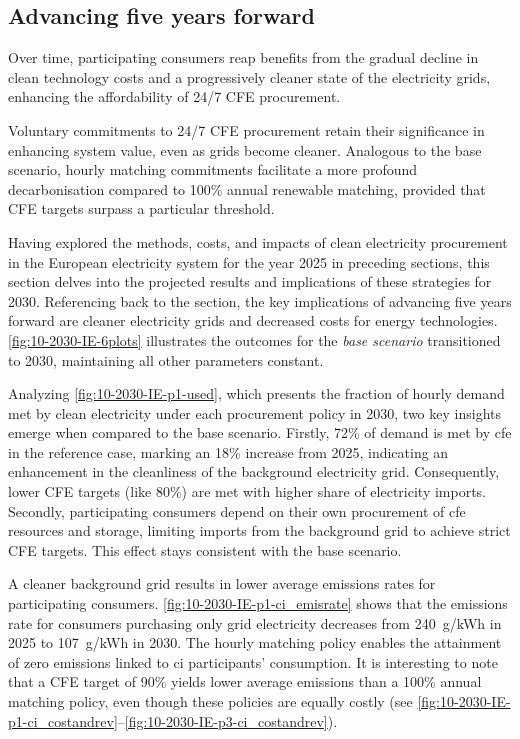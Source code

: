 \subsection{Advancing five years forward}
\label{subsec:time}

\begin{res}
    Over time, participating consumers reap benefits from the gradual decline in clean technology costs and a progressively cleaner state of the electricity grids, enhancing the affordability of 24/7 CFE procurement.
\end{res}

\begin{res}
    Voluntary commitments to 24/7 CFE procurement retain their significance in enhancing system value, even as grids become cleaner. Analogous to the base scenario, hourly matching commitments facilitate a more profound decarbonisation compared to 100\% annual renewable matching, provided that CFE targets surpass a particular threshold.
\end{res}

Having explored the methods, costs, and impacts of clean electricity procurement in the European electricity system for the year 2025 in preceding sections, this section delves into the projected results and implications of these strategies for 2030.
Referencing back to the  section, the key implications of advancing five years forward are cleaner electricity grids and decreased costs for energy  technologies. \cref{fig:10-2030-IE-6plots} illustrates the outcomes for the \textit{base scenario} transitioned to 2030, maintaining all other parameters constant. 

Analyzing \cref{fig:10-2030-IE-p1-used}, which presents the fraction of hourly demand met by clean electricity under each procurement policy in 2030, two key insights emerge when compared to the base scenario.
Firstly, 72\% of demand is met by \gls{cfe} in the reference case, marking an 18\% increase from 2025, indicating an enhancement in the cleanliness of the background electricity grid.
Consequently, lower CFE targets (like 80\%) are met with higher share of electricity imports.
Secondly, participating consumers depend on their own procurement of \gls{cfe} resources and storage, limiting imports from the background grid to achieve strict CFE targets. 
This effect stays consistent with the base scenario.

A cleaner background grid results in lower average emissions rates for participating consumers.
\cref{fig:10-2030-IE-p1-ci_emisrate} shows that the emissions rate for consumers purchasing only grid electricity decreases from 240~g\co/kWh in 2025 to 107~g\co/kWh in 2030.
The hourly matching policy enables the attainment of zero emissions linked to \gls{ci} participants' consumption.
It is interesting to note that a CFE target of 90\% yields lower average emissions than a 100\% annual matching policy, even though these policies are equally costly (see \cref{fig:10-2030-IE-p1-ci_costandrev}--\cref{fig:10-2030-IE-p3-ci_costandrev}).

